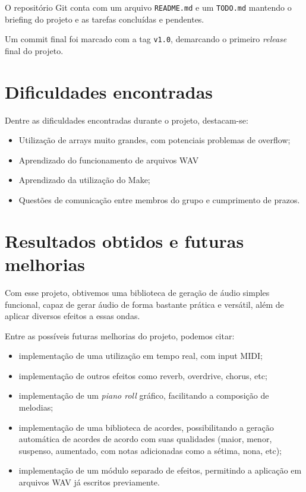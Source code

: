 \documentclass{article}
\begin{document}
O repositório Git conta com um arquivo \texttt{README.md} e um \texttt{TODO.md} mantendo o briefing do projeto e as tarefas concluídas e pendentes.

Um commit final foi marcado com a tag \texttt{v1.0}, demarcando o primeiro \textit{release} final do projeto.

\section{Dificuldades encontradas}
Dentre as dificuldades encontradas durante o projeto, destacam-se:
\begin{itemize}
    \item Utilização de arrays muito grandes, com potenciais problemas de overflow;
    \item Aprendizado do funcionamento de arquivos WAV
    \item Aprendizado da utilização do Make;
    \item Questões de comunicação entre membros do grupo e cumprimento de prazos.
\end{itemize}

\section{Resultados obtidos e futuras melhorias}
Com esse projeto, obtivemos uma biblioteca de geração de áudio simples funcional, capaz de gerar áudio de forma bastante prática e versátil, além de aplicar diversos efeitos a essas ondas.

Entre as possíveis futuras melhorias do projeto, podemos citar: 
\begin{itemize}
    \item implementação de uma utilização em tempo real, com input MIDI;
    \item implementação de outros efeitos como reverb, overdrive, chorus, etc;
    \item implementação de um \textit{piano roll} gráfico, facilitando a composição de melodias;
    \item implementação de uma biblioteca de acordes, possibilitando a geração automática de acordes de acordo com suas qualidades (maior, menor, suspenso, aumentado, com notas adicionadas como a sétima, nona, etc);
    \item implementação de um módulo separado de efeitos, permitindo a aplicação em arquivos WAV já escritos previamente.
\end{itemize}
\end{document}
